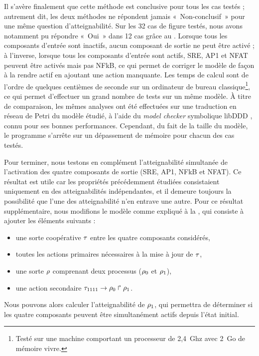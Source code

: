 Il s'avère finalement que cette méthode est conclusive pour tous les cas testés ;
autrement dit, les deux méthodes ne répondent jamais «~Non-conclusif~»
pour une même question d'atteignabilité.
Sur les 32 cas de figure testés,
nous avons notamment pu répondre «~Oui~» dans 12 cas
grâce au .
Lorsque tous les composants d'entrée sont inactifs, aucun composant de sortie ne peut
être activé ;
à l'inverse, lorsque tous les composants d'entrée sont actifs,
SRE, AP1 et NFAT peuvent être activés mais pas NFkB,
ce qui permet de corriger le modèle de façon à la rendre actif en ajoutant une action manquante.
Les temps de calcul sont de l'ordre de quelques centièmes de seconde sur un ordinateur
de bureau classique\footnote{Testé sur une machine comportant
un processeur de 2,4~Ghz avec 2~Go de mémoire vivre.},
ce qui permet d'effectuer un grand nombre de tests sur un même modèle.
À titre de comparaison, les mêmes analyses ont été effectuées 
sur une traduction en réseau de Petri du modèle étudié,
à l'aide du \textit{model checker} symbolique libDDD \cite{Kordon09libddd},
connu pour ses bonnes performances.
Cependant, du fait de la taille du modèle, le programme s'arrête sur un dépassement de mémoire
pour chacun des cas testés.

\myskip

Pour terminer, nous testons en complément l'atteignabilité simultanée
de l'activation des quatre composants de sortie (SRE, AP1, NFkB et NFAT).
Ce résultat est utile car les propriétés précédemment étudiées consistaient uniquement
en des atteignabilités indépendantes, et il demeure toujours la possibilité
que l'une des atteignabilité n'en entrave une autre.
Pour ce résultat supplémentaire, nous modifions le modèle comme expliqué à la
, qui consiste à ajouter les éléments suivants :
\begin{itemize}
  \item une sorte coopérative $\tau$ entre les quatre composants considérés,
  \item toutes les actions primaires nécessaires à la mise à jour de $\tau$,
  \item une sorte $\rho$ comprenant deux processus ($\rho_0$ et $\rho_1$),
  \item une action secondaire $\tau_{1111}\rightarrow\rho_0\Rsh\rho_1$.
\end{itemize}
Nous pouvons alors calculer l'atteignabilité de $\rho_1$, qui permettra de déterminer
si les quatre composants peuvent être simultanément actifs depuis l'état initial.

